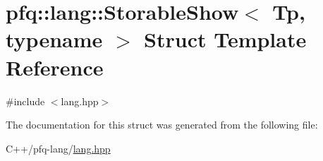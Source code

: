\hypertarget{structpfq_1_1lang_1_1StorableShow}{\section{pfq\+:\+:lang\+:\+:Storable\+Show$<$ Tp, typename $>$ Struct Template Reference}
\label{structpfq_1_1lang_1_1StorableShow}
}


{\ttfamily \#include $<$lang.\+hpp$>$}



The documentation for this struct was generated from the following file\+:\begin{DoxyCompactItemize}
\item 
C++/pfq-\/lang/\hyperlink{lang_8hpp}{lang.\+hpp}\end{DoxyCompactItemize}
